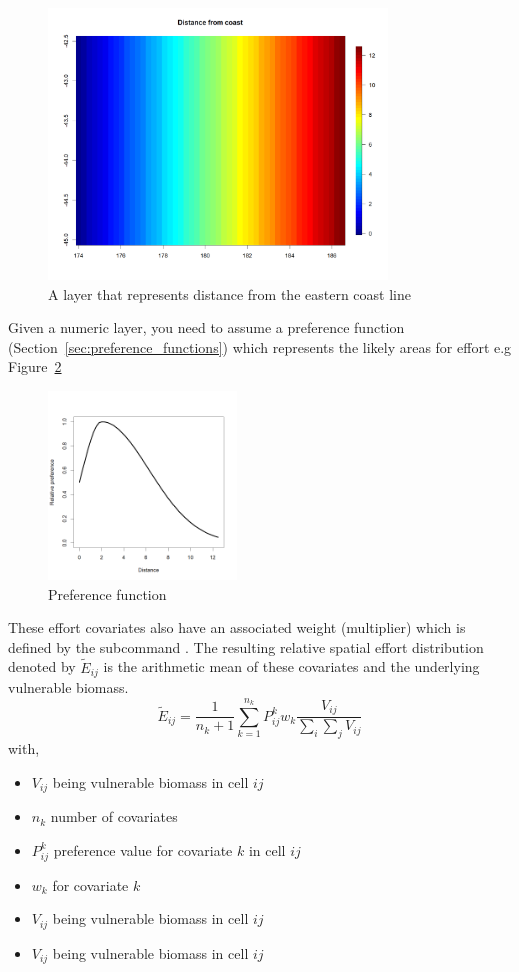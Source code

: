 \begin{figure}[H]
	\centering
	\includegraphics[width=9cm]{Figures/Distance.png} 
	\caption{A layer that represents distance from the eastern coast line}
	\label{fig:distance}%
\end{figure}
Given a numeric layer, you need to assume a preference function (Section~\ref{sec:preference_functions}) which represents the likely areas for effort e.g Figure~\ref{fig:pref_distance}
\begin{figure}[H]
	\centering
	\includegraphics[width=5cm]{Figures/distance_preference_function.png} 
	\caption{Preference function}
	\label{fig:pref_distance}%
\end{figure}
These effort covariates also have an associated weight (multiplier) which is defined by the subcommand . The resulting relative spatial effort distribution denoted by \(\tilde{E}_{ij}\) is the arithmetic mean of these covariates and the underlying vulnerable biomass.
\begin{equation}
	\tilde{E}_{ij} = \frac{1}{n_k + 1}\sum\limits_{k = 1}^{n_k} P^k_{ij} w_k  \frac{V_{ij}}{\sum_i\sum_j V_{ij}}
\end{equation}
with,
\begin{itemize}
	\item \(V_{ij}\) being vulnerable biomass in cell \(ij\)
	\item \(n_k\) number of covariates
	\item \(P^k_{ij}\) preference value for covariate \(k\)  in cell \(ij\)
	\item \(w_k \)  for covariate \(k\)
	\item \(V_{ij}\) being vulnerable biomass in cell \(ij\)
	\item \(V_{ij}\) being vulnerable biomass in cell \(ij\)
\end{itemize}
